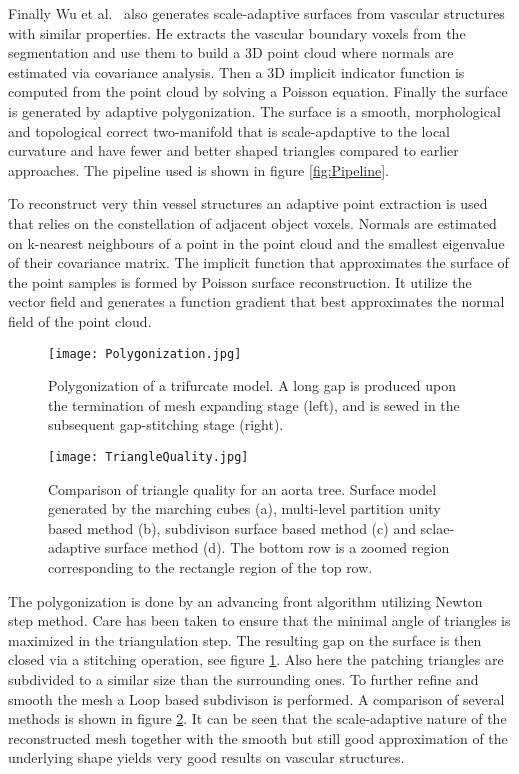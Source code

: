 Finally Wu et al.~\cite{wu2010scale} also generates scale-adaptive surfaces from vascular structures with similar properties. He extracts the vascular boundary voxels from the segmentation and use them to build a 3D point cloud where normals are estimated via covariance analysis. Then a 3D implicit indicator function is computed from the point cloud by solving a Poisson equation. Finally the surface is generated by adaptive polygonization.
The surface is a smooth, morphological and topological correct two-manifold that is scale-apdaptive to the local curvature and have fewer and better shaped triangles compared to earlier approaches. The pipeline used is shown in figure \ref{fig:Pipeline}. 

To reconstruct very thin vessel structures an adaptive point extraction is used that relies on the constellation of adjacent object voxels. Normals are estimated on k-nearest neighbours of a point in the point cloud and the smallest eigenvalue of their covariance matrix. The implicit function that approximates the surface of the point samples is formed by Poisson surface reconstruction. It utilize the vector field and generates a function gradient that best approximates the normal field of the point cloud.

\begin{figure}[h]
	\centering
	\texttt{[image: Polygonization.jpg]} \\
	\caption{Polygonization of a trifurcate model. A long gap is produced upon the termination of mesh
		expanding stage (left), and is sewed in the subsequent gap-stitching stage (right).}
	\cite{wu2010scale}
	\label{fig:Polygonization}
\end{figure} 

\begin{figure}[h]
	\centering
	\texttt{[image: TriangleQuality.jpg]} \\
	\caption{ Comparison of triangle quality for an aorta tree. Surface model generated by the marching cubes (a),
		multi-level partition unity based method (b), subdivison surface based method (c) and sclae-adaptive surface method (d). The bottom row is a zoomed region corresponding to the rectangle region of the top row.}
	\cite{wu2010scale}
	\label{fig:TriangleQuality}
\end{figure} 

The polygonization is done by an advancing front algorithm utilizing Newton step method. Care has been taken to ensure that the minimal angle of triangles is maximized in the triangulation step. The resulting gap on the surface is then closed via a stitching operation, see figure \ref{fig:Polygonization}. Also here the patching triangles are subdivided to a similar size than the surrounding ones. To further refine and smooth the mesh a Loop based subdivison is performed.
A comparison of several methods is shown in figure \ref{fig:TriangleQuality}. It can be seen that the scale-adaptive nature of the reconstructed mesh together with the smooth but still good approximation of the underlying shape yields very good results on vascular structures. 
